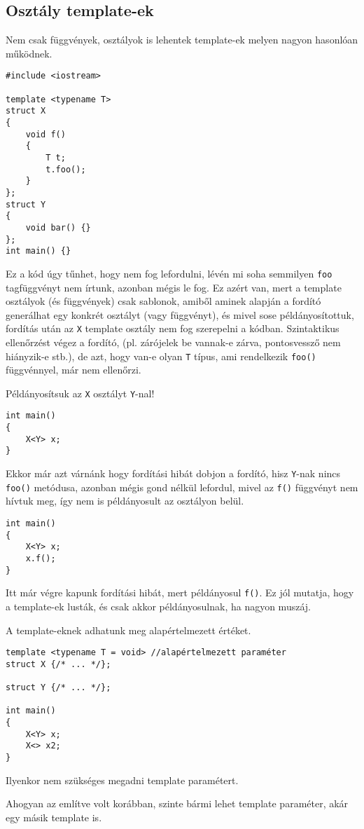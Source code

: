 \documentclass[a4paper,11.5pt,table]{article}
\begin{document}
	\subsection{Osztály template-ek}
	Nem csak függvények, osztályok is lehentek template-ek melyen nagyon hasonlóan működnek.
	\begin{lstlisting}
#include <iostream>

template <typename T>
struct X
{
	void f()
	{
		T t;
		t.foo();
	}
};
struct Y
{
	void bar() {}
};
int main() {}
	\end{lstlisting}
	Ez a kód úgy tűnhet, hogy nem fog lefordulni, lévén mi soha semmilyen \texttt{foo} tagfüggvényt nem írtunk, azonban mégis le fog. Ez azért van, mert a template osztályok (és függvények) csak sablonok, amiből aminek alapján a fordító generálhat egy konkrét osztályt (vagy függvényt), és mivel sose példányosítottuk, fordítás után az \texttt{X} template osztály nem fog szerepelni a kódban. Szintaktikus ellenőrzést végez a fordító, (pl. zárójelek be vannak-e zárva, pontosvessző nem hiányzik-e stb.), de azt, hogy van-e olyan \texttt{T} típus, ami rendelkezik \texttt{foo()} függvénnyel, már nem ellenőrzi.
	
	\smallskip
	Példányosítsuk az \texttt{X} osztályt \texttt{Y}-nal!
\begin{lstlisting}
int main()
{
	X<Y> x;
}
\end{lstlisting}
	Ekkor már azt várnánk hogy fordítási hibát dobjon a fordító, hisz \texttt{Y}-nak nincs \texttt{foo()} metódusa, azonban mégis gond nélkül lefordul, mivel az \texttt{f()} függvényt nem hívtuk meg, így nem is példányosult az osztályon belül.
	\begin{lstlisting}
int main()
{
	X<Y> x;
	x.f();
}
	\end{lstlisting}
	Itt már végre kapunk fordítási hibát, mert példányosul \texttt{f()}. Ez jól mutatja, hogy a template-ek lusták, és csak akkor példányosulnak, ha nagyon muszáj.
	\medskip
	
	A template-eknek adhatunk meg alapértelmezett értéket.

\begin{lstlisting}
template <typename T = void> //alapértelmezett paraméter
struct X {/* ... */};

struct Y {/* ... */};

int main()
{
	X<Y> x;
	X<> x2;
}
\end{lstlisting}
	Ilyenkor nem szükséges megadni template paramétert. 
	
	\smallskip
	Ahogyan az említve volt korábban, szinte bármi lehet template paraméter, akár egy másik template is.
\end{document}
